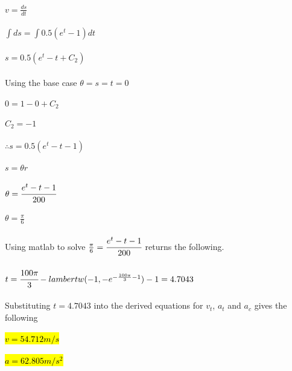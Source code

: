 \documentclass{article}
\begin{document}
\subsection{}
$v = \frac{ds}{dt}$\\ \\
$\int ds = \int 0.5(e^t - 1)dt$\\ \\
$s = 0.5(e^t - t + C_2)$\\ \\
Using the base case $\theta = s = t = 0$\\ \\
$0 = 1 - 0 + C_2$\\ \\
$C_2 = -1$\\ \\
$\therefore s = 0.5(e^t - t-1)$\\ \\
$s = \theta r$\\ \\
$\theta = \cfrac{e^t - t - 1}{200}$\\ \\
$\theta = \frac{\pi}{6}$\\ \\
Using matlab to solve $\frac{\pi}{6} = \cfrac{e^t - t - 1}{200}$ returns the following. \\ \\
$ t = \cfrac{100\pi}{3} - lambertw(-1, -e^{- \frac{100\pi}{3} - 1}) - 1 = 4.7043$ \\ \\

Substituting $t = 4.7043$ into the derived equations for $v_t$, $a_t$ and $a_c$ gives the following\\ \\
\hl{$v = 54.712 m/s$} \\ \\
\hl{$a = 62.805 m/s^2$} \\ \\
\end{document}
